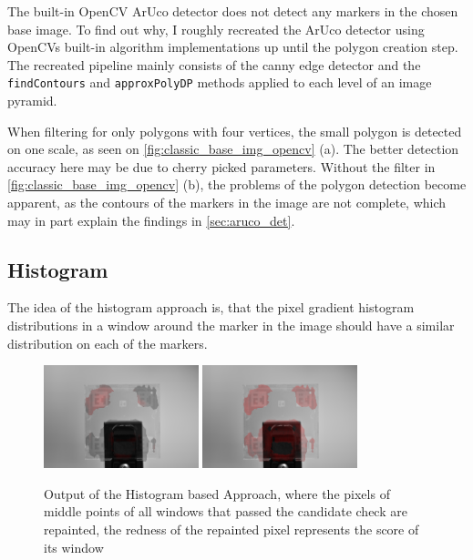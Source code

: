 \documentclass[10pt]{book}
\begin{document}
The built-in \ac{OpenCV} \ac{ArUco} detector does not detect any markers in the chosen base image. To find out why, I roughly recreated the \ac{ArUco} detector using \acp{OpenCV} built-in algorithm implementations up until the polygon creation step. The recreated pipeline mainly consists of the canny edge detector and the \texttt{findContours} and \texttt{approxPolyDP} methods applied to each level of an image pyramid. 

When filtering for only polygons with four vertices, the small polygon is detected on one scale, as seen on \autoref{fig:classic_base_img_opencv} (a). The better detection accuracy here may be due to cherry picked parameters. Without the filter in \autoref{fig:classic_base_img_opencv} (b), the problems of the polygon detection become apparent, as the contours of the markers in the image are not complete, which may in part explain the findings in \autoref{sec:aruco_det}.

\subsection{Histogram}

The idea of the histogram approach is, that the pixel gradient histogram distributions in a window around the marker in the image should have a similar distribution on each of the markers.

\begin{figure}
  \centering
     {\includegraphics[width=0.4\textwidth]{image/classic_hist_markerynesses}}
     {\includegraphics[width=0.4\textwidth]{image/classic_markeryness}}
  \caption{Output of the Histogram based Approach, where the pixels of middle points of all windows that passed the candidate check are repainted, the redness of the repainted pixel represents the score of its window}
  \label{fig:markeryness_scores}
\end{figure}
\end{document}
